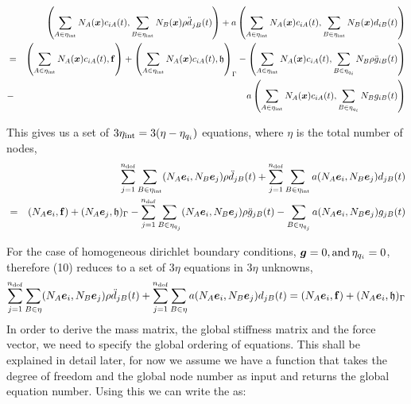 \begin{eqnarray*}
& & \left( \sum_{A \in \eta_{\operatorname{int}}} N_A (\boldsymbol{x}) c_{i A} ( t ),
   \sum_{B \in \eta_{\operatorname{int}}} N_B (\boldsymbol{x}) \rho \ddot{d_{}}_{j B} (
   t ) \right) + a \left( \sum_{A \in \eta_{\operatorname{int}}} N_A (\boldsymbol{x})
   c_{i A} ( t ), \sum_{B \in \eta_{\operatorname{int}}} N_B (\boldsymbol{x}) d_{i B} (
   t ) \right) \\
&=& \left( \sum_{A \in \eta_{\operatorname{int}}} N_A (\boldsymbol{x}) c_{i
   A} ( t ),\mathbf{f} \right) + \left( \sum_{A \in \eta_{\operatorname{int}}} N_A
   (\boldsymbol{x}) c_{i A} ( t ),\mathfrak{h} \right)_{\Gamma} -   
   \left( \sum_{A \in \eta_{\operatorname{int}}} N_A (\boldsymbol{x}) c_{i A} ( t ),
   \sum_{B \in \eta_{q_i}} N_B \rho \ddot{g}_{i B} ( t ) \right) \\
&-& a\left(  \sum_{A \in \eta_{\operatorname{int}}} N_A (\boldsymbol{x}) c_{i A} ( t ), \sum_{B
   \in \eta_{q_i}} N_B g_{i B} ( t ) \right) 
\end{eqnarray*}

This gives us a set of $3 \eta_{\operatorname{int}} = 3 ( \eta - \eta_{q_i} )$
equations, where $\eta$ is the total number of nodes,
\begin{eqnarray*}
& & \sum^{n_{\operatorname{dof}}}_{j = 1} \sum_{B \in \eta_{\operatorname{int}}} ( N_A
  \boldsymbol{e}_i, N_B \boldsymbol{e}_j ) \rho \ddot{d}_{j B} ( t ) + \sum_{j =
  1}^{n_{\operatorname{dof}}} \sum_{B \in \eta_{\operatorname{int}}} a ( N_A \boldsymbol{e}_i,
  N_B \boldsymbol{e}_j ) d_{j B} ( t ) \\
&=& ( N_A \boldsymbol{e}_i,\mathbf{f}) + ( N_A \boldsymbol{e}_j,\mathfrak{h})_{\Gamma}  - \sum^{n_{\operatorname{dof}}}_{j = 1}
  \sum_{B \in \eta_{q_j}} ( N_A \boldsymbol{e}_i, N_B \boldsymbol{e}_j ) \rho
  \ddot{g}_{j B} ( t ) - \sum_{B \in \eta_{q_j}} a ( N_A \boldsymbol{e}_i, N_B
  \boldsymbol{e}_j ) g_{j B} ( t )
\end{eqnarray*}


For the case of homogeneous dirichlet boundary conditions, $\boldsymbol{g}= 0,
\operatorname{and} \eta_{q_i} = 0$, therefore (10) reduces to a set of $3 \eta$
equations in $3 \eta$ unknowns,
\begin{equation}
  \sum^{n_{\operatorname{dof}}}_{j = 1} \sum_{B \in \eta} ( N_A \boldsymbol{e}_i, N_B
  \boldsymbol{e}_j ) \rho \ddot{d}_{j B} ( t ) + \sum^{n_{\operatorname{dof}}}_{j = 1}
  \sum_{B \in \eta} a ( N_A \boldsymbol{e}_i, N_B \boldsymbol{e}_j ) d_{j B} ( t )
  = ( N_A \boldsymbol{e}_i,\mathbf{f}) + ( N_A
  \boldsymbol{e}_i,\mathfrak{h})_{\Gamma}
\end{equation}
In order to derive the mass matrix, the global stiffness matrix and the force
vector, we need to specify the global ordering of equations. This shall be
explained in detail later, for now we assume we have a function
{} that takes the degree of freedom and the global node
number as input and returns the global equation number. Using this we can
write the {} as:

